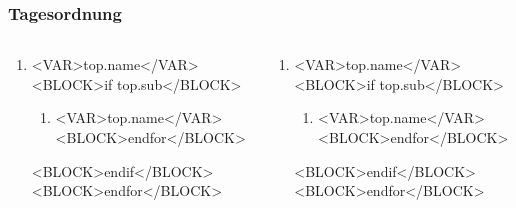 \documentclass[12pt,aspectratio=169]{beamer}
\begin{document}
    \begin{frame}[squeeze]
        \frametitle{Tagesordnung}

        \begin{columns}

            \begin{column}{0.5\textwidth}
                \begin{enumerate}
                    <BLOCK>for top in tops_left</BLOCK>
                        \item <VAR>top.name</VAR>
                        <BLOCK>if top.sub</BLOCK>
                            \begin{enumerate}
                                <BLOCK>for top in top.sub</BLOCK>
                                    \item <VAR>top.name</VAR>
                                <BLOCK>endfor</BLOCK>
                            \end{enumerate}
                        <BLOCK>endif</BLOCK>
                    <BLOCK>endfor</BLOCK>
                \end{enumerate}
            \end{column}

            \vrule width 1pt

            \begin{column}{0.5\textwidth}
                \begin{enumerate}
                    \setcounter{enumi}{<VAR>tops_left | count</VAR>}
                    <BLOCK>for top in tops_right</BLOCK>
                        \item <VAR>top.name</VAR>
                        <BLOCK>if top.sub</BLOCK>
                            \begin{enumerate}
                                <BLOCK>for top in top.sub</BLOCK>
                                    \item <VAR>top.name</VAR>
                                <BLOCK>endfor</BLOCK>
                            \end{enumerate}
                        <BLOCK>endif</BLOCK>
                    <BLOCK>endfor</BLOCK>
                \end{enumerate}
            \end{column}

        \end{columns}
    \end{frame}
\end{document}
